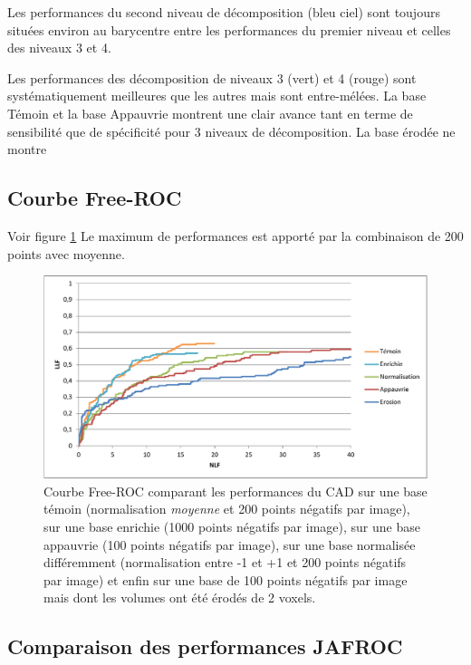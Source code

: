 Les performances du second niveau de décomposition (bleu ciel) sont toujours situées environ au barycentre entre les performances du premier niveau et celles des niveaux 3 et 4.

Les performances des décomposition de niveaux 3 (vert) et 4 (rouge) sont systématiquement meilleures que les autres mais sont entre-mélées. La base Témoin et la base Appauvrie montrent une clair avance tant en terme de sensibilité que de spécificité pour 3 niveaux de décomposition. La base érodée ne montre 



\subsection{Courbe Free-ROC}

Voir figure \ref{lab:froc_comp_static}
Le maximum de performances est apporté par la combinaison de 200 points avec moyenne.

\begin{figure}[h!]
 
 \begin{center}
   \includegraphics[width=15cm]{images/FROC_param}
 \end{center}
 \caption{\label{lab:froc_comp_static} Courbe Free-ROC comparant les performances du CAD sur une base témoin (normalisation \emph{moyenne} et 200 points négatifs par image), sur une base enrichie (1000 points négatifs par image), sur une base appauvrie (100 points négatifs par image), sur une base normalisée différemment (normalisation entre -1 et +1 et 200 points négatifs par image) et enfin sur une base de 100 points négatifs par image mais dont les volumes ont été érodés de 2 voxels.}

\end{figure}


\subsection{Comparaison des performances JAFROC}

